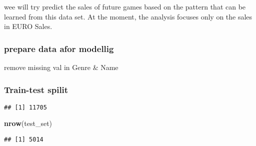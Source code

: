 \documentclass[]{article}
\newenvironment{Shaded}{\begin{snugshade}}{\end{snugshade}}
\newcommand{\DataTypeTok}[1]{\textcolor[rgb]{0.13,0.29,0.53}{#1}}
\newcommand{\FloatTok}[1]{\textcolor[rgb]{0.00,0.00,0.81}{#1}}
\newcommand{\KeywordTok}[1]{\textcolor[rgb]{0.13,0.29,0.53}{\textbf{#1}}}
\newcommand{\NormalTok}[1]{#1}
\newcommand{\OperatorTok}[1]{\textcolor[rgb]{0.81,0.36,0.00}{\textbf{#1}}}
\newcommand{\OtherTok}[1]{\textcolor[rgb]{0.56,0.35,0.01}{#1}}
\newcommand{\StringTok}[1]{\textcolor[rgb]{0.31,0.60,0.02}{#1}}
\begin{document}
wee will try predict the sales of future games based on the pattern that
can be learned from this data set. At the moment, the analysis focuses
only on the sales in EURO Sales.

\hypertarget{prepare-data-afor-modellig}{%
\subsubsection{prepare data afor
modellig}\label{prepare-data-afor-modellig}}

remove missing val in Genre \& Name

\begin{Shaded}
\end{Shaded}

\hypertarget{train-test-spilit}{%
\subsubsection{Train-test spilit}\label{train-test-spilit}}

\begin{Shaded}
\end{Shaded}

\begin{verbatim}
## [1] 11705
\end{verbatim}

\begin{Shaded}
\begin{Highlighting}[]
\KeywordTok{nrow}\NormalTok{(test_set)}
\end{Highlighting}
\end{Shaded}

\begin{verbatim}
## [1] 5014
\end{verbatim}
\end{document}
